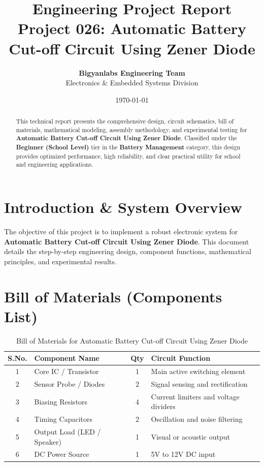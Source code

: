 \documentclass[11pt,a4paper]{article}
\title{\textbf{\Huge Engineering Project Report}\\[0.5em] \Large Project 026: Automatic Battery Cut-off Circuit Using Zener Diode}
\author{\textbf{Bigyanlabs Engineering Team}\\ Electronics \& Embedded Systems Division}
\date{\today}
\begin{document}
\maketitle
\thispagestyle{empty}

\begin{abstract}
This technical report presents the comprehensive design, circuit schematics, bill of materials, mathematical modeling, assembly methodology, and experimental testing for \textbf{Automatic Battery Cut-off Circuit Using Zener Diode}. Classified under the \textbf{Beginner (School Level)} tier in the \textbf{Battery Management} category, this design provides optimized performance, high reliability, and clear practical utility for school and engineering applications.
\end{abstract}

\newpage
\tableofcontents
\newpage

\section{Introduction \& System Overview}
The objective of this project is to implement a robust electronic system for \textbf{Automatic Battery Cut-off Circuit Using Zener Diode}. This document details the step-by-step engineering design, component functions, mathematical principles, and experimental results.

\section{Bill of Materials (Components List)}
\begin{table}[h!]
\centering
\caption{Bill of Materials for Automatic Battery Cut-off Circuit Using Zener Diode}
\vspace{0.5em}
\begin{tabular}{clcp{7cm}}
\toprule
\textbf{S.No.} & \textbf{Component Name} & \textbf{Qty} & \textbf{Circuit Function} \\
\midrule
1 & Core IC / Transistor & 1 & Main active switching element \\
2 & Sensor Probe / Diodes & 2 & Signal sensing and rectification \\
3 & Biasing Resistors & 4 & Current limiters and voltage dividers \\
4 & Timing Capacitors & 2 & Oscillation and noise filtering \\
5 & Output Load (LED / Speaker) & 1 & Visual or acoustic output \\
6 & DC Power Source & 1 & 5V to 12V DC input \\
\bottomrule
\end{tabular}
\end{table}
\end{document}
